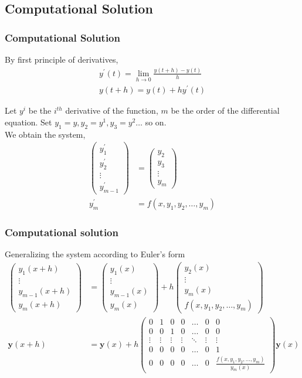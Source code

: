 \documentclass{beamer}
\providecommand{\brak}[1]{\ensuremath{\left(#1\right)}}
\theoremstyle{remark}
\newcommand{\myvec}[1]{\ensuremath{\begin{pmatrix}#1\end{pmatrix}}}
\let\vec\mathbf
\numberwithin{equation}{section}
\begin{document}
    \subsection{Computational Solution}
		\begin{frame}
			\frametitle{Computational Solution}
By first principle of derivatives,
      {\small
\begin{align}
    y^{\prime}\brak{t} = \lim_{h\to 0}\frac{y\brak{t+h} - y\brak{t}}{h}\\
    y\brak{t+h} = y\brak{t} + hy^{\prime}\brak{t}
\end{align}
      }

Let $y^{i}$ be the $i^{th}$ derivative of the function, $m$ be the order of the differential equation. Set $y_1=y, y_2=y^{1}, y_3=y^{2} \dots$ so on.\\
We obtain the system,
      {\small
\begin{align}
    \myvec{y_1^{\prime} \\ y_2^{\prime} \\ \vdots \\ y_{m-1}^{\prime} }&=\myvec{y_2 \\ y_3 \\ \vdots \\ y_m}\\
y_m^{\prime}&=f\brak{x, y_1, y_2, \dots, y_m}
\end{align}
      }
		\end{frame}
		\begin{frame}
      \frametitle{Computational solution}
Generalizing the system according to Euler's form\\
      {\small
\begin{align}
  \myvec{y_1\brak{x+h} \\ \vdots \\ y_{m-1}\brak{x+h} \\ y_m\brak{x+h}} &=\myvec{y_1\brak{x} \\ \vdots \\ y_{m-1}\brak{x} \\ y_m\brak{x}} + h\myvec{y_2\brak{x} \\ \vdots \\ y_m\brak{x} \\f\brak{x, y_1, y_2, \dots, y_m} }\\
  \vec{y}\brak{x+h} &= \vec{y}\brak{x} + h\myvec{0 & 1 & 0 & 0 & \dots & 0 & 0\\ 0 & 0 & 1 & 0 & \dots & 0 & 0\\\vdots & \vdots & \vdots & \vdots& \ddots & \vdots & \vdots\\
  0 & 0 & 0 & 0 & \dots & 0 & 1\\0 & 0 & 0 & 0 & \dots & 0 &\frac{f\brak{x, y_1, y_2, \dots, y_m}}{y_m\brak{x}}}\vec{y}\brak{x}
\end{align}
      }
		\end{frame}
\end{document}
